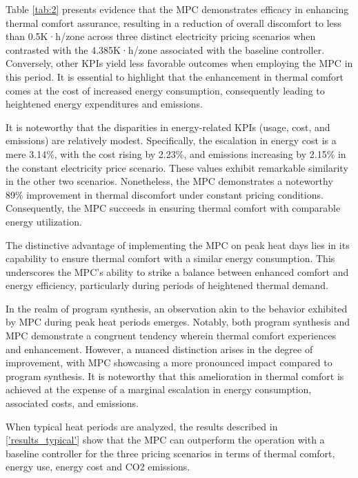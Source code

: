 Table \ref{tab:2} presents evidence that the MPC demonstrates efficacy in enhancing thermal comfort assurance, resulting in a reduction of overall discomfort to less than 0.5K·h/zone across three distinct electricity pricing scenarios when contrasted with the 4.385K·h/zone associated with the baseline controller. Conversely, other KPIs yield less favorable outcomes when employing the MPC in this period. It is essential to highlight that the enhancement in thermal comfort comes at the cost of increased energy consumption, consequently leading to heightened energy expenditures and emissions.

It is noteworthy that the disparities in energy-related KPIs (usage, cost, and emissions) are relatively modest. Specifically, the escalation in energy cost is a mere 3.14\%, with the cost rising by 2.23\%, and emissions increasing by 2.15\% in the constant electricity price scenario. These values exhibit remarkable similarity in the other two scenarios. Nonetheless, the MPC demonstrates a noteworthy 89\% improvement in thermal discomfort under constant pricing conditions. Consequently, the MPC succeeds in ensuring thermal comfort with comparable energy utilization.

The distinctive advantage of implementing the MPC on peak heat days lies in its capability to ensure thermal comfort with a similar energy consumption. This underscores the MPC's ability to strike a balance between enhanced comfort and energy efficiency, particularly during periods of heightened thermal demand.

In the realm of program synthesis, an observation akin to the behavior exhibited by MPC during peak heat periods emerges. Notably, both program synthesis and MPC demonstrate a congruent tendency wherein thermal comfort experiences and enhancement. However, a nuanced distinction arises in the degree of improvement, with MPC showcasing a more pronounced impact compared to program synthesis. It is noteworthy that this amelioration in thermal comfort is achieved at the expense of a marginal escalation in energy consumption, associated costs, and emissions.

When typical heat periods are analyzed, the results described in \ref{'results_typical'} show that the MPC can outperform the operation with a baseline controller for the three pricing scenarios in terms of thermal comfort, energy use, energy cost and CO2 emissions. 

